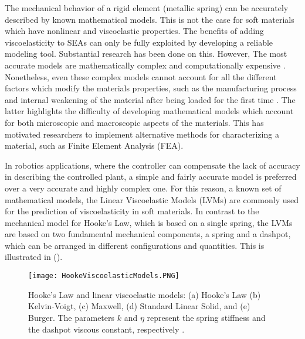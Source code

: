 The mechanical behavior of a rigid element (metallic spring) can be accurately described by known mathematical models. This is not the case for soft materials which have nonlinear and viscoelastic properties. The benefits of adding viscoelasticity to SEAs can only be fully exploited by developing a  reliable modeling tool. Substantial research has been done on this. However, The most accurate models are mathematically complex and computationally expensive \cite{xu2014mathematical,ciniello2017identifying,lu2017constitutive}. Nonetheless, even these complex models cannot account for all the different  factors which modify the materials properties, such as the manufacturing process and internal weakening of the material after being loaded for the first time \cite{case2015soft}. The latter highlights the difficulty of developing mathematical models which account for both microscopic and macroscopic aspects of the materials. This has motivated researchers to implement alternative methods for characterizing a material, such as Finite Element Analysis (FEA).

In robotics applications, where the controller can compensate the lack of accuracy in describing the controlled plant, a simple and fairly accurate model is preferred over a very accurate and highly complex one. For this reason, a known set of mathematical models, the Linear Viscoelastic Models (LVMs) are commonly used for the prediction of viscoelasticity in soft materials. In contrast to the mechanical model for Hooke's Law, which is based on a single spring, the LVMs are based on two fundamental mechanical components, a spring and a dashpot, which can be arranged in different configurations and quantities. This is illustrated in ().

\begin{figure}[hbt!]
	\centering
    \texttt{[image: HookeViscoelasticModels.PNG]}
    \caption{Hooke's Law and linear viscoelastic models: (a) Hooke's Law (b) Kelvin-Voigt, (c) Maxwell, (d) Standard Linear Solid, and (e) Burger. The parameters $k$ and $\eta$ represent the spring stiffness and the dashpot viscous constant, respectively \cite{austin2015control}. }
    \label{fig:LinearViscoelasticModels}
\end{figure}

